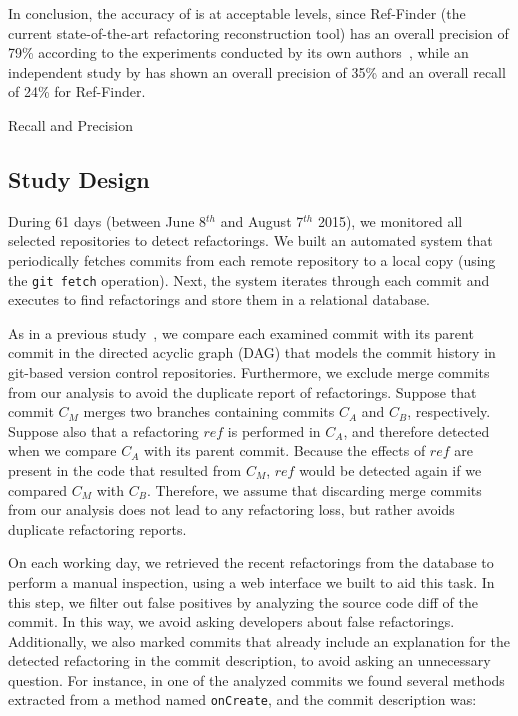 In conclusion, the accuracy of \toolName is at acceptable levels,
since Ref-Finder (the current state-of-the-art refactoring reconstruction tool)
has an overall precision of 79\% according to the experiments conducted by its own authors~\citep{Prete:2010},
while an independent study by \cite{Soares:2013} has shown an overall precision of 35\% and an overall recall of 24\% for Ref-Finder.

\begin{table}[htb]
\centering
\renewcommand{\arraystretch}{1.2}
\caption{\toolName Recall and Precision}
\label{TabRefDetectorEval}

\end{table}



\subsection{Study Design}
\label{sec:study_design}

During 61 days (between June 8$^{th}$ and August 7$^{th}$ 2015), we monitored all selected repositories to 
detect refactorings.
We built an automated system that periodically fetches commits from each remote repository to a local
copy (using the \texttt{git fetch} operation). Next, the system iterates through each commit and executes \toolName to
find refactorings and store them in a relational database.

As in a previous study~\citep{tsantalis_empiricalstudy}, we compare each examined commit with its parent 
commit in the directed acyclic graph (DAG) that models the commit history in git-based version control repositories.
Furthermore, we exclude merge commits from our analysis to avoid the duplicate report of refactorings.
Suppose that commit $C_M$ merges two branches containing commits $C_A$ and $C_B$, respectively.
Suppose also that a refactoring $\mathit{ref}$ is performed in $C_A$, and therefore detected when we compare 
$C_A$ with its parent commit.
Because the effects of $\mathit{ref}$ are present in the code that resulted from $C_M$, $\mathit{ref}$ 
would be detected again if we compared $C_M$ with $C_B$.
Therefore, we assume that discarding merge commits from our analysis does not lead to any refactoring loss, but rather
avoids duplicate refactoring reports.


On each working day, we retrieved the recent refactorings from the database to perform a manual inspection, using
a web interface we built to aid this task.
In this step, we filter out false positives by analyzing the source code diff of the commit. In this way, 
we avoid asking developers about false refactorings.
Additionally, we also marked commits that already include an explanation for the detected refactoring in
the commit description, to avoid asking an unnecessary question. For instance, in one of the analyzed commits
we found several methods extracted from a method named \texttt{onCreate}, and the commit description was:\margin

